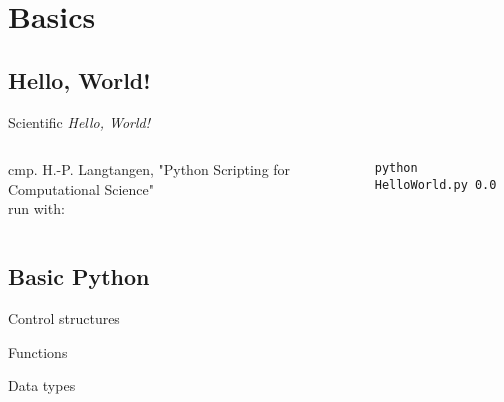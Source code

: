 \section{Basics}

\subsection{Hello, World!}

\begin{frame}[fragile]{Scientific \emph{Hello, World!}}

\begin{columns}
    




cmp. H.-P. Langtangen, "Python Scripting for Computational Science"\\[1ex]

run with:
\begin{verbatim}
python HelloWorld.py 0.0
\end{verbatim}


\end{columns}


\end{frame}

\subsection{Basic Python}

\begin{frame}[fragile]{Control structures}



\end{frame}

\begin{frame}[fragile]{Functions}



\end{frame}

\begin{frame}[fragile]{Data types}



\end{frame}

